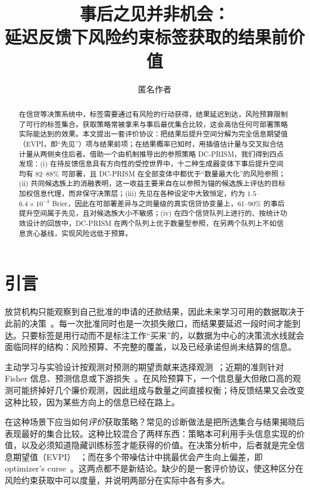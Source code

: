 \documentclass[runningheads]{llncs}
\begin{document}
\title{事后之见并非机会：\\延迟反馈下风险约束标签获取的结果前价值}
\author{匿名作者}
\maketitle
\begin{abstract}
在信贷等决策系统中，标签需要通过有风险的行动获得，结果延迟到达，风险预算限制了可行的标签集合。获取策略常被拿来与事后最优集合比较，这会高估任何可部署策略实际能达到的效果。本文提出一套评价协议：把结果后提升空间分解为完全信息期望值（EVPI，即“先见”）项与结果前项；在结果概率已知时，用插值估计量与交叉拟合估计量从两侧夹住后者。借助一个由机制推导出的参照策略 DC-PRISM，我们得到四点发现：(i) 在待反馈信息具有方向性的受控世界中，十二种生成器变体下事后提升空间均有 82--88\% 可部署，且 DC-PRISM 在全部变体中都优于“数量最大化”的风险参照；(ii) 共同候选族上的消融表明，这一收益主要来自在以参照为锚的候选族上评估的目标加权信息代理，而非保守决策层；(iii) 先见在各种设定中大致恒定，约为 $1.5$--$6.4\times10^{-3}$ Brier，因此在可部署差异与之同量级的真实信贷协变量上，61--90\% 的事后提升空间属于先见，且对候选族大小不敏感；(iv) 在四个信贷队列上进行的、按统计功效设计的回放中，DC-PRISM 在两个队列上优于数量型参照，在另两个队列上不如信息贪心基线，实现风险远低于预算。
\end{abstract}

\section{引言}
\label{sec:intro}
放贷机构只能观察到自己批准的申请的还款结果，因此未来学习可用的数据取决于此前的决策~\cite{lakkaraju2017selective,wei2021selective}。每一次批准同时也是一次损失敞口，而结果要延迟一段时间才能到达。只要标签是用行动而不是标注工作“买来”的，以数据为中心的决策流水线就会面临同样的结构：风险预算、不完整的覆盖，以及已经承诺但尚未结算的信息。

主动学习与实验设计按观测对预测的期望贡献来选择观测~\cite{cohn1996active,chaloner1995bayesian,settles2009active}；近期的准则针对 Fisher 信息、预测信息或下游损失~\cite{ash2021fishing,bickfordsmith2023prediction,huang2026loss}。在风险预算下，一个信息量大但敞口高的观测可能挤掉好几个廉价观测，因此组成与数量之间直接权衡；待反馈结果又会改变这种比较，因为某些方向上的信息已经在路上。

在这种场景下应当如何\emph{评价}获取策略？常见的诊断做法是把所选集合与结果揭晓后表现最好的集合比较。这种比较混合了两样东西：策略本可利用手头信息实现的价值，以及必须知道隐藏训练标签才能获得的价值。在决策分析中，后者就是完全信息期望值（EVPI）~\cite{howard1966information,raiffa1961applied}；而在多个带噪估计中挑最优会产生向上偏差，即 optimizer's curse~\cite{smith2006optimizer}。这两点都不是新结论。缺少的是一套评价协议，使这种区分在风险约束获取中可以度量，并说明两部分在实际中各有多大。
\end{document}
